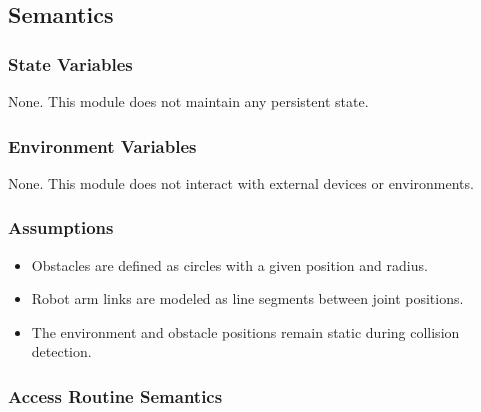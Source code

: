 \documentclass[12pt, titlepage]{article}
\begin{document}
\subsection{Semantics}

\subsubsection{State Variables}

None. This module does not maintain any persistent state.

\subsubsection{Environment Variables}

None. This module does not interact with external devices or environments.

\subsubsection{Assumptions}

\begin{itemize}
  \item Obstacles are defined as circles with a given position and radius.
  \item Robot arm links are modeled as line segments between joint positions.
  \item The environment and obstacle positions remain static during collision detection.
\end{itemize}

\subsubsection{Access Routine Semantics}
\end{document}
